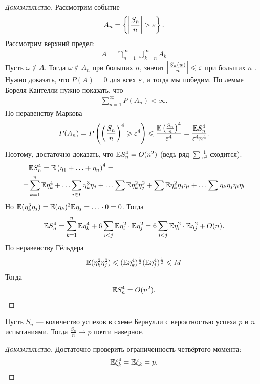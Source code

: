 \documentclass[../main.tex]{subfiles}
\begin{document}
\begin{proof}[\normalfont\textsc{Доказательство}]
 Рассмотрим событие
 \begin{align*}
  A_n = \left\{ \left| \frac{S_n}{n} \right| > \varepsilon \right\}.
 \end{align*} Рассмотрим верхний предел:
 \begin{align*}
  A = \bigcap_{n=1}^{\infty} \bigcup_{k=n}^{\infty} A_k
 \end{align*} Пусть $ \omega \notin A $. Тогда $ \omega \notin A_n $ при больших $ n $, значит $ \left| \frac{S_n(w)}{n} \right| \leqslant \varepsilon $  при больших $ n $ . Нужно доказать, что $ P(A) = 0 $ для всех  $ \varepsilon $, и тогда мы победим. По лемме Бореля-Кантелли нужно показать, что
 \begin{align*}
  \sum_{n=1}^{\infty} P(A_n) < \infty.
 \end{align*} По неравенству Маркова
 \begin{align*}
  P(A_n) = P \left( \left( \frac{S_n}{n} \right)^{4} \geqslant \varepsilon^{4} \right) \leqslant \frac{\mathbb E \left( \frac{S_n}{n} \right)^{4}}{\varepsilon^{4}} = \frac{\mathbb E S_n^{4}}{\varepsilon^{4} n^{4}}.
 \end{align*} Поэтому, достаточно доказать, что $ \mathbb E S_n^{4} = O(n^{2}) $ (ведь ряд $ \sum \frac{1}{n^{2}} $ сходится).
 \begin{align*}
  &\mathbb E S_n^{4} = \mathbb E \left( \eta_1 + \ldots + \eta_n \right)^{4} = \\
  = &\sum_{k=1}^{n}\mathbb E\eta_k^{4} + \ldots \sum_{i \in I} \eta_k^{3} \eta_j + \ldots \sum \mathbb E \eta_k^{2} \eta_j^{2} + \sum \mathbb E \eta^{2}_k \eta_j \eta_i + \ldots \sum \eta_k \eta_j \eta_i \eta_l
 \end{align*} Но $ \mathbb E(\eta_k^{3} \eta_j) = \mathbb E(\eta_k)^{3} \mathbb E \eta_j = \ldots \cdot 0 = 0 $. Тогда
 \begin{align*}
  \mathbb E S_n^{4} = \sum_{k=1}^{n}\mathbb E \eta_k^{4} + 6 \sum_{i < j} \mathbb E \eta_i^{2} \cdot \mathbb E \eta_j^{2} = 6 \sum_{i < j} \mathbb E \eta_i^{2} \cdot \mathbb E \eta_j^{2} + O(n).
 \end{align*}
 По неравенству Гёльдера
 \begin{align*}
  \mathbb E(\eta_k^{2} \eta_j^{2}) \leqslant (\mathbb E \eta_k^{4})^{\frac{1}{2}}(\mathbb E \eta_j^{4})^{\frac{1}{2}} \leqslant M
 \end{align*} Тогда
 \begin{align*}
  \mathbb E S_n^{4} = O(n^{2}).
 \end{align*}
\end{proof}

\begin{crly}
	\label{crly:strong_law_of_large_numbers_for_bernoulli_scheme}
 Пусть $ S_n $ --- количество успехов в схеме Бернулли с вероятностью успеха  $ p $ и  $ n $ испытаниями. Тогда $ \frac{S_n}{n} \to p $  почти наверное.
\end{crly}
\begin{proof}[\normalfont\textsc{Доказательство}]
 Достаточно проверить ограниченность четвёртого момента:
 \begin{align*}
  \mathbb E \xi_k^{4} = \mathbb E \xi_k = p.
 \end{align*}
\end{proof}
\end{document}
